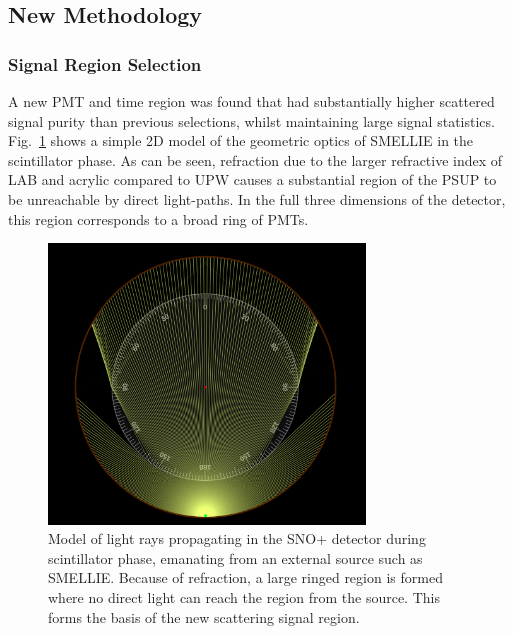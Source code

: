 \subsection{New Methodology}\label{sec:smellie_scatt_new_method}
\subsubsection{Signal Region Selection}
A new PMT and time region was found that had substantially higher scattered signal purity than previous selections, whilst maintaining large signal statistics. Fig.~\ref{fig:smellie_propagation_toy_model} shows a simple 2D model of the geometric optics of SMELLIE in the scintillator phase. As can be seen, refraction due to the larger refractive index of LAB and acrylic compared to UPW causes a substantial region of the PSUP to be unreachable by direct light-paths. In the full three dimensions of the detector, this region corresponds to a broad ring of PMTs.

\begin{figure}[!th]
    \centering
    \includegraphics[width=0.75\textwidth]{5_SMELLIEAnalysis/images/smellie_scattering_region_ray_optics_model.png}
    \caption[Model of light rays propagating in the SNO+ detector during scintillator phase, emanating from an external source such as SMELLIE]
    {Model of light rays propagating in the SNO+ detector during scintillator phase, emanating from an external source such as SMELLIE. Because of refraction, a large ringed region is formed where no direct light can reach the region from the source. This forms the basis of the new scattering signal region.}
    \label{fig:smellie_propagation_toy_model}
\end{figure}

